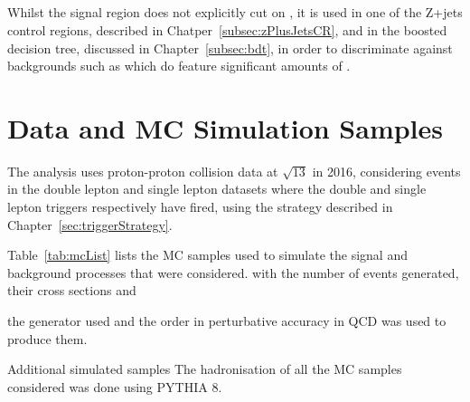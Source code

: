 \subsection{\MET}\label{subsec:met}
Whilst the signal region does not explicitly cut on \MET, it is used in one of the Z+jets control regions, described in Chatper~\ref{subsec:zPlusJetsCR}, and in the boosted decision tree, discussed in Chapter~\ref{subsec:bdt}, in order to discriminate against backgrounds such as \ttbar which do feature significant amounts of \MET.

\section{Data and MC Simulation Samples}\label{sec:samples}
The analysis uses proton-proton collision data at $\sqrt{13}$ in 2016, considering events in the double lepton and single lepton datasets where the double and single lepton triggers respectively have fired, using the strategy described in Chapter~\ref{sec:triggerStrategy}.

Table~\ref{tab:mcList} lists the MC samples used to simulate the signal and background processes that were considered.
 with the number of events generated, their cross sections and 
 
 the generator used and the order in perturbative accuracy in QCD was used to produce them.

Additional simulated samples 
The hadronisation of all the MC samples considered was done using PYTHIA 8.


